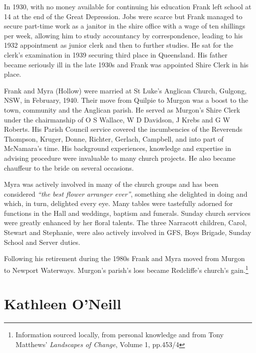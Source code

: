 In 1930, with no money available for continuing his education Frank left school at 14 at the end of the Great Depression. Jobs were scarce but Frank managed to secure part-time work as a janitor in the shire office with a wage of ten shillings per week, allowing him to study accountancy by correspondence, leading to his 1932 appointment as junior clerk and then to further studies. He sat for the clerk's examination in 1939 securing third place in Queensland. His father became seriously ill in the late 1930s and Frank was appointed Shire Clerk in his place.



Frank and Myra (Hollow) were married at St Luke's Anglican Church, Gulgong, NSW, in February, 1940. Their move from Quilpie to Murgon was a boost to the town, community and the Anglican parish. He served as Murgon's Shire Clerk under the chairmanship of O S Wallace, W D Davidson, J Krebs and G W Roberts. His Parish Council service covered the incumbencies of the Reverends Thompson, Kruger, Donne, Richter, Gerlach, Campbell, and into part of McNamara's time. His background experiences, knowledge and expertise in advising procedure were invaluable to many church projects. He also became chauffeur to the bride on several occasions.



Myra was actively involved in many of the church groups and has been considered \emph{``the best flower arranger ever''}, something she delighted in doing and which, in turn, delighted every eye. Many tables were tastefully adorned for functions in the Hall and weddings, baptism and funerals. Sunday church services were greatly enhanced by her floral talents. The three Narracott children, Carol, Stewart and Stephanie, were also actively involved in GFS, Boys Brigade, Sunday School and Server duties.



Following his retirement during the 1980s Frank and Myra moved from Murgon to Newport Waterways. Murgon's parish's loss became Redcliffe's church's gain.\footnote{Information sourced locally, from personal knowledge and from Tony Matthews' \emph{Landscapes of Change}, Volume 1, pp.453/4}


\section{Kathleen O'Neill}



